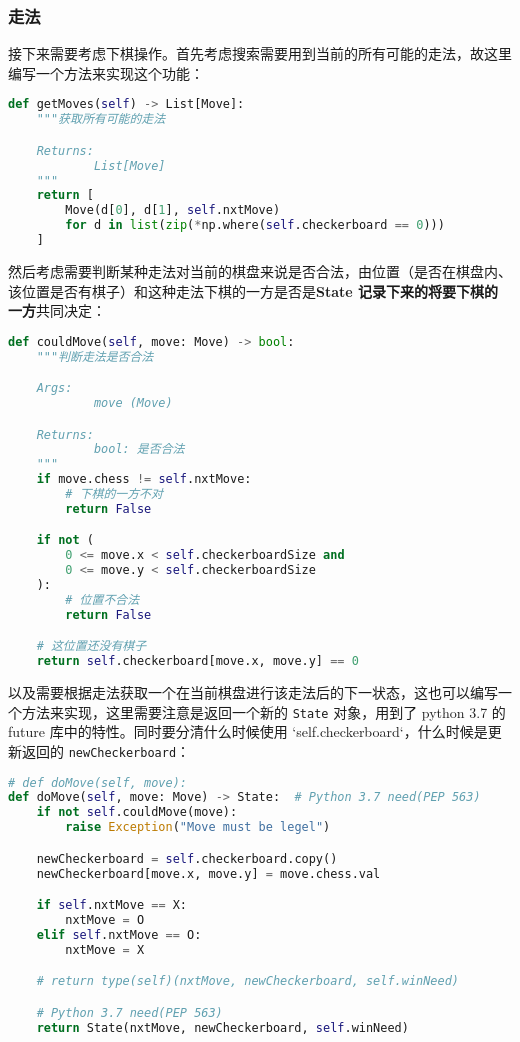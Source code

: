 \subsubsection{走法}
接下来需要考虑下棋操作。首先考虑搜索需要用到当前的所有可能的走法，故这里编写一个方法来实现这个功能：
\begin{lstlisting}[language=python]
def getMoves(self) -> List[Move]:
    """获取所有可能的走法

    Returns:
            List[Move]
    """
    return [
        Move(d[0], d[1], self.nxtMove)
        for d in list(zip(*np.where(self.checkerboard == 0)))
    ]
\end{lstlisting}

然后考虑需要判断某种走法对当前的棋盘来说是否合法，由位置（是否在棋盘内、该位置是否有棋子）和这种走法下棋的一方是否是\textbf{State 记录下来的将要下棋的一方}共同决定：
\begin{lstlisting}[language=python]
def couldMove(self, move: Move) -> bool:
    """判断走法是否合法

    Args:
            move (Move)

    Returns:
            bool: 是否合法
    """
    if move.chess != self.nxtMove:
        # 下棋的一方不对
        return False

    if not (
        0 <= move.x < self.checkerboardSize and
        0 <= move.y < self.checkerboardSize
    ):
        # 位置不合法
        return False

    # 这位置还没有棋子
    return self.checkerboard[move.x, move.y] == 0
\end{lstlisting}

以及需要根据走法获取一个在当前棋盘进行该走法后的下一状态，这也可以编写一个方法来实现，这里需要注意是返回一个新的 \verb`State` 对象，用到了 python 3.7 的 future 库中的特性。同时要分清什么时候使用 `self.checkerboard`，什么时候是更新返回的 \verb`newCheckerboard`：
\begin{lstlisting}[language=python]
# def doMove(self, move):
def doMove(self, move: Move) -> State:  # Python 3.7 need(PEP 563)
    if not self.couldMove(move):
        raise Exception("Move must be legel")

    newCheckerboard = self.checkerboard.copy()
    newCheckerboard[move.x, move.y] = move.chess.val

    if self.nxtMove == X:
        nxtMove = O
    elif self.nxtMove == O:
        nxtMove = X

    # return type(self)(nxtMove, newCheckerboard, self.winNeed)

    # Python 3.7 need(PEP 563)
    return State(nxtMove, newCheckerboard, self.winNeed)
\end{lstlisting}


